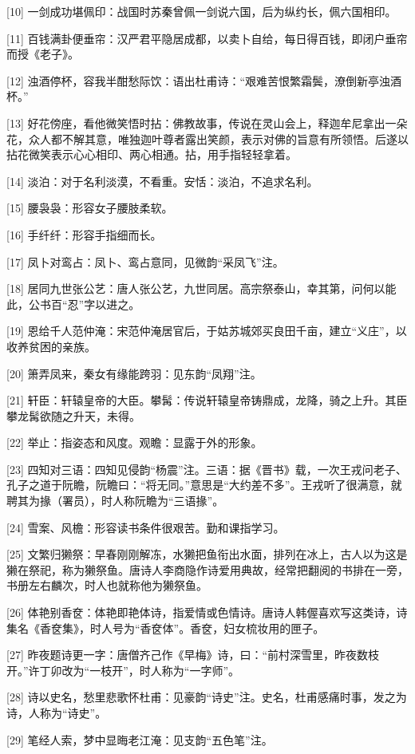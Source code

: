 \documentclass[12pt,UTF8]{ctexbook}
\begin{document}
[10] 一剑成功堪佩印：战国时苏秦曾佩一剑说六国，后为纵约长，佩六国相印。

[11] 百钱满卦便垂帘：汉严君平隐居成都，以卖卜自给，每日得百钱，即闭户垂帘而授《老子》。

[12] 浊酒停杯，容我半酣愁际饮：语出杜甫诗：“艰难苦恨繁霜鬓，潦倒新亭浊酒杯。”

[13] 好花傍座，看他微笑悟时拈：佛教故事，传说在灵山会上，释迦牟尼拿出一朵花，众人都不解其意，唯独迦叶尊者露出笑颜，表示对佛的旨意有所领悟。后遂以拈花微笑表示心心相印、两心相通。拈，用手指轻轻拿着。

[14] 淡泊：对于名利淡漠，不看重。安恬：淡泊，不追求名利。

[15] 腰袅袅：形容女子腰肢柔软。

[16] 手纤纤：形容手指细而长。

[17] 凤卜对鸾占：凤卜、鸾占意同，见微韵“采凤飞”注。

[18] 居同九世张公艺：唐人张公艺，九世同居。高宗祭泰山，幸其第，问何以能此，公书百“忍”字以进之。

[19] 恩给千人范仲淹：宋范仲淹居官后，于姑苏城郊买良田千亩，建立“义庄”，以收养贫困的亲族。

[20] 箫弄凤来，秦女有缘能跨羽：见东韵“凤翔”注。

[21] 轩臣：轩辕皇帝的大臣。攀髯：传说轩辕皇帝铸鼎成，龙降，骑之上升。其臣攀龙髯欲随之升天，未得。

[22] 举止：指姿态和风度。观瞻：显露于外的形象。

[23] 四知对三语：四知见侵韵“杨震”注。三语：据《晋书》载，一次王戎问老子、孔子之道于阮瞻，阮瞻曰：“将无同。”意思是“大约差不多”。王戎听了很满意，就聘其为掾（署员），时人称阮瞻为“三语掾”。

[24] 雪案、风檐：形容读书条件很艰苦。勤和课指学习。

[25] 文繁归獭祭：早春刚刚解冻，水獭把鱼衔出水面，排列在冰上，古人以为这是獭在祭祀，称为獭祭鱼。唐诗人李商隐作诗爱用典故，经常把翻阅的书排在一旁，书册左右麟次，时人也就称他为獭祭鱼。

[26] 体艳别香奁：体艳即艳体诗，指爱情或色情诗。唐诗人韩偓喜欢写这类诗，诗集名《香奁集》，时人号为“香奁体”。香奁，妇女梳妆用的匣子。

[27] 昨夜题诗更一字：唐僧齐己作《早梅》诗，曰：“前村深雪里，昨夜数枝开。”许丁卯改为“一枝开”，时人称为“一字师”。

[28] 诗以史名，愁里悲歌怀杜甫：见豪韵“诗史”注。史名，杜甫感痛时事，发之为诗，人称为“诗史”。

[29] 笔经人索，梦中显晦老江淹：见支韵“五色笔”注。
\end{document}
